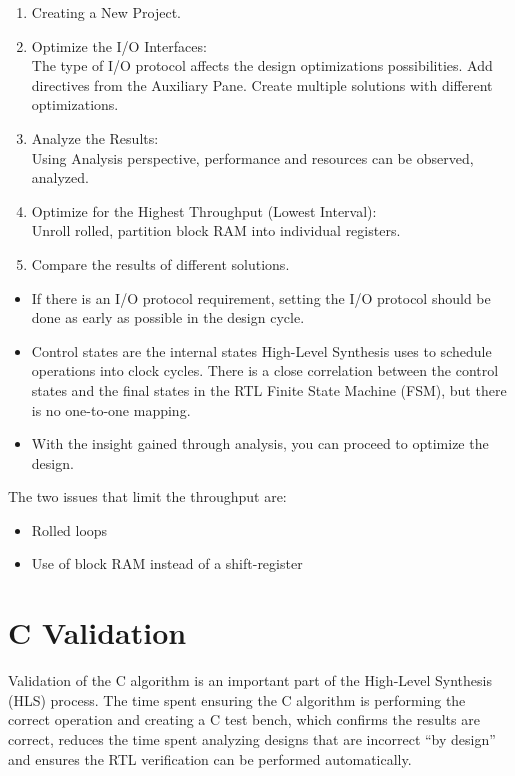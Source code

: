 \begin{enumerate}[label=Step \arabic*:]
    \item Creating a New Project.    
    \item Optimize the I/O Interfaces:\\ The type of I/O protocol affects
    the design optimizations possibilities. Add directives from the Auxiliary Pane. Create multiple solutions with different optimizations.
    \item Analyze the Results:\\ Using Analysis perspective, performance and resources can be observed, analyzed. 
    \item Optimize for the Highest Throughput (Lowest Interval):\\ Unroll rolled, partition block RAM into individual registers.
    \item Compare the results of different solutions.
\end{enumerate}

\begin{itemize}
    \item If there is an I/O protocol requirement, setting the I/O protocol should be done as early as possible in the design cycle.
    \item Control states are the internal states High-Level Synthesis uses to schedule operations into clock cycles. There is a close
    correlation between the control states and the final states in the RTL Finite State Machine (FSM), but there is no one-to-one mapping.
    \item With the insight gained through analysis, you can proceed to optimize the design.
\end{itemize}

The two issues that limit the throughput are:
\begin{itemize}
    \item Rolled loops
    \item Use of block RAM instead of a shift-register
\end{itemize}


\section{C Validation}
Validation of the C algorithm is an important part of the High-Level Synthesis (HLS) process.
The time spent ensuring the C algorithm is performing the correct operation and creating
a C test bench, which confirms the results are correct, reduces the time spent analyzing
designs that are incorrect “by design” and ensures the RTL verification can be performed
automatically.

